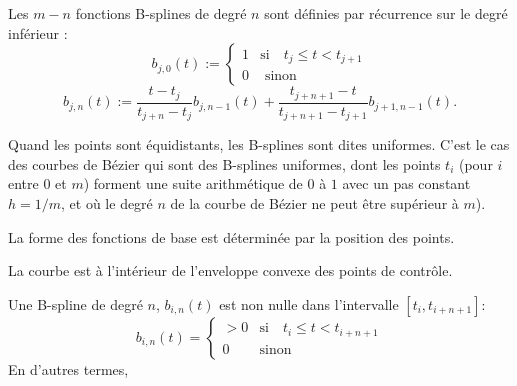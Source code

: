 \medskip
Les $m-n$ fonctions B-splines de degré $n$ sont définies par récurrence sur le degré inférieur :
\begin{equation}
    b_{j, 0}(t) := \left\{ \begin{matrix} 1 & \mathrm{si} \quad t_j \leqslant t < t_{j + 1} \\ 0 & \text{ sinon} \end{matrix} \right. 
\end{equation}
\begin{equation}
    b_{j, n}(t) := \frac{t - t_j}{t_{j + n} - t_j} b_{j, n - 1}(t) + \frac{t_{j + n + 1} - t}{t_{j + n + 1} - t_{j + 1}} b_{j + 1, n - 1}(t).
\end{equation}

Quand les points sont équidistants, les B-splines sont dites uniformes.
C'est le cas des courbes de Bézier qui sont des B-splines uniformes, dont les points $t_i$ (pour $i$ entre $0$ et 
$m$) forment une suite arithmétique de $0$ à $1$ avec un pas constant $h=1/m$, et où le degré $n$ 
de la courbe de Bézier ne peut être supérieur à $m$).

\medskip
{}

\medskip
La forme des fonctions de base est déterminée par la position des points.

La courbe est à l'intérieur de l'enveloppe convexe des points de contrôle.

Une B-spline de degré $n$, $b_{i,n}(t)$ est non nulle dans l'intervalle $[t_i, t_{i+n+1}]$:
\begin{equation}
    b_{i,n}(t) = \left\{\begin{matrix} >0 & \mathrm{si} \quad t_{i} \leqslant t < t_{i+n+1} \\ 0 & \mathrm{sinon} \end{matrix} \right. 
\end{equation}
En d'autres termes, 

